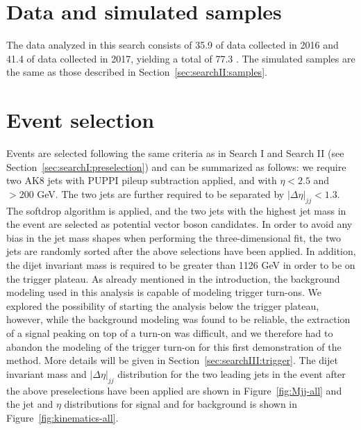 \section{Data and simulated samples}
The data analyzed in this search consists of 35.9 \fbinv of data collected in 2016 and 41.4 \fbinv of data collected in 2017, yielding a total of 77.3 \fbinv.\newline
The simulated samples are the same as those described in Section~\ref{sec:searchII:samples}.

\section{Event selection}
Events are selected following the same criteria as in Search I and Search II (see Section~\ref{sec:searchI:preselection}) and can be summarized as follows: we require two AK8 jets with PUPPI pileup subtraction applied, and with $\eta < 2.5$ and \pt $> 200$ GeV. The two jets are further required to be separated by $|\Delta\eta|_{jj} < 1.3$. The softdrop algorithm is applied, and the two jets with the highest jet mass in the event are selected as potential vector boson candidates. In order to avoid any bias in the jet mass shapes when performing the three-dimensional fit, the two jets are randomly sorted after the above selections have been applied. In addition, the dijet invariant mass is required to be greater than 1126 GeV in order to be on the trigger plateau. As already mentioned in the introduction, the background modeling used in this analysis is capable of modeling trigger turn-ons. We explored the possibility of starting the analysis below the trigger plateau, however, while the background modeling was found to be reliable, the extraction of a signal peaking on top of a turn-on was difficult, and we therefore had to abandon the modeling of the trigger turn-on for this first demonstration of the method. More details will be given in Section~\ref{sec:searchIII:trigger}. The dijet invariant mass and $|\Delta\eta|_{jj}$ distribution for the two leading jets in the event after the above preselections have been applied are shown in Figure~\ref{fig:Mjj-all} and the jet \PT{} and $\eta$ distributions for signal and for background is shown in Figure~\ref{fig:kinematics-all}.
